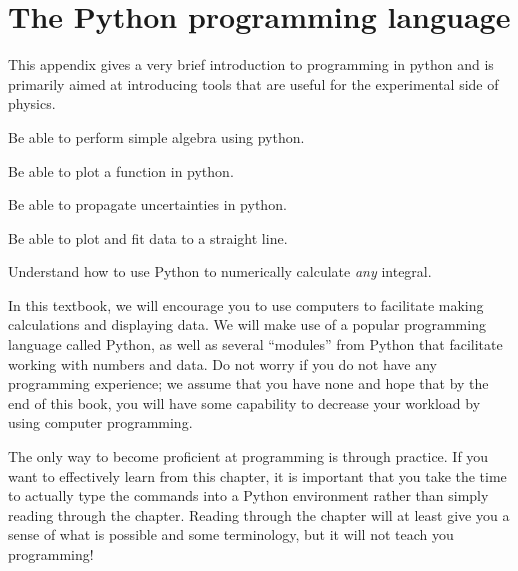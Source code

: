 \chapter{The Python programming language}
\label{app:python}
This appendix gives a very brief introduction to programming in python and is primarily aimed at introducing tools that are useful for the experimental side of physics. 
 \vspace{1cm}
\begin{learningObjectives}
{
\item Be able to perform simple algebra using python.
\item Be able to plot a function in python.
\item Be able to propagate uncertainties in python.
\item Be able to plot and fit data to a straight line.
\item Understand how to use Python to numerically calculate \textit{any} integral.
}
\end{learningObjectives}

In this textbook, we will encourage you to use computers to facilitate making calculations and displaying data. We will make use of a popular programming language called Python, as well as several ``modules'' from Python that facilitate working with numbers and data. Do not worry if you do not have any programming experience; we assume that you have none and hope that by the end of this book, you will have some capability to decrease your workload by using computer programming.

The only way to become proficient at programming is through practice. If you want to effectively learn from this chapter, it is important that you take the time to actually type the commands into a Python environment rather than simply reading through the chapter. Reading through the chapter will at least give you a sense of what is possible and some terminology, but it will not teach you programming!

